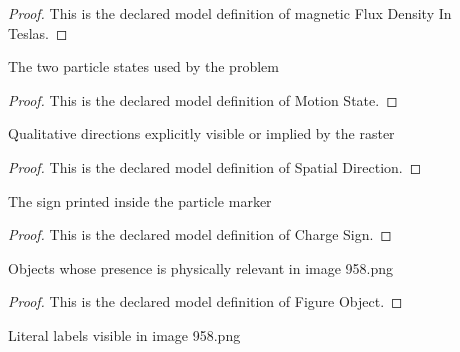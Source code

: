 \begin{proof}
  This is the declared model definition of magnetic Flux Density In Teslas.
\end{proof}
\begin{definition}
  \label{def:physics:phyx-mini-0958:phyxminiproblems-problemphyxmini0958-motionstate}
  The two particle states used by the problem
\end{definition}
\begin{proof}
  This is the declared model definition of Motion State.
\end{proof}
\begin{definition}
  \label{def:physics:phyx-mini-0958:phyxminiproblems-problemphyxmini0958-spatialdirection}
  Qualitative directions explicitly visible or implied by the raster
\end{definition}
\begin{proof}
  This is the declared model definition of Spatial Direction.
\end{proof}
\begin{definition}
  \label{def:physics:phyx-mini-0958:phyxminiproblems-problemphyxmini0958-chargesign}
  The sign printed inside the particle marker
\end{definition}
\begin{proof}
  This is the declared model definition of Charge Sign.
\end{proof}
\begin{definition}
  \label{def:physics:phyx-mini-0958:phyxminiproblems-problemphyxmini0958-figureobject}
  Objects whose presence is physically relevant in image 958.png
\end{definition}
\begin{proof}
  This is the declared model definition of Figure Object.
\end{proof}
\begin{definition}
  \label{def:physics:phyx-mini-0958:phyxminiproblems-problemphyxmini0958-figurelabel}
  Literal labels visible in image 958.png
\end{definition}
